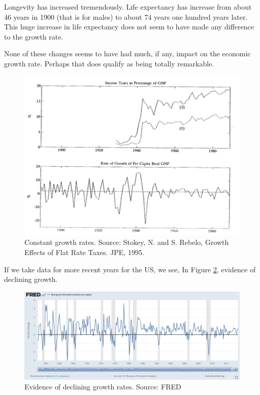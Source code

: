 \documentclass[
]{book}
\begin{document}
Longevity has increased tremendously. Life expectancy has increase from about 46 years in 1900 (that is for males) to about 74 years one hundred years later. This huge increase in life expectancy does not seem to have made any difference to the growth rate.

None of these changes seems to have had much, if any, impact on the economic growth rate. Perhaps that does qualify as being totally remarkable.

\begin{figure}

{\centering \includegraphics[width=1\linewidth]{img/ch1/growth12} 

}

\caption{Constant growth rates. Source: Stokey, N. and S. Rebelo, Growth Effects of Flat Rate Taxes. JPE, 1995.}\label{fig:fig112}
\end{figure}

If we take data for more recent years for the US, we see, In Figure \ref{fig:fig113}, evidence of declining growth.

\begin{figure}

{\centering \includegraphics[width=1\linewidth]{img/ch1/growth13} 

}

\caption{Evidence of declining growth rates. Source: FRED}\label{fig:fig113}
\end{figure}
\end{document}
